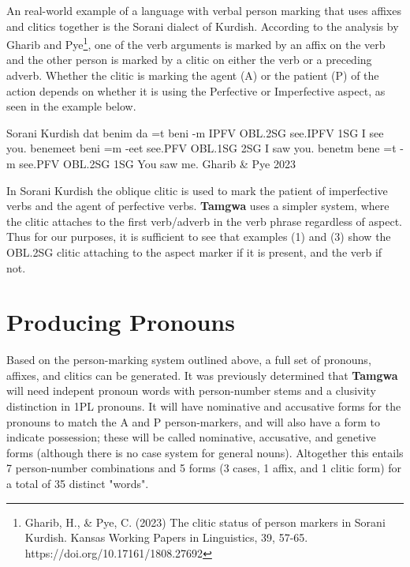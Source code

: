 \documentclass[a4paper,12pt,twoside,openright]{memoir}
\begin{document}
    An real-world example of a language with verbal person marking that uses affixes and clitics together is the Sorani dialect of Kurdish.  According to the analysis by Gharib and Pye\footnote{Gharib, H., \& Pye, C. (2023) The clitic status of person markers in Sorani Kurdish. Kansas Working Papers in Linguistics, 39, 57-65. https://doi.org/10.17161/1808.27692}, one of the verb arguments is marked by an affix on the verb and the other person is marked by a clitic on either the verb or a preceding adverb.  Whether the clitic is marking the agent (A) or the patient (P) of the action depends on whether it is using the Perfective or Imperfective aspect, as seen in the example below.

\begin{examples}
    \ex
    \lect Sorani Kurdish
    \words {} dat  benim
    \bits da =t beni -m
    \gloss IPFV OBL.2SG see.IPFV 1SG
    \tr I see you.
    \ex
    \words {} benemeet
    \bits beni =m -eet
    \gloss see.PFV OBL.1SG 2SG
    \tr I saw you.
    \ex
    \words {} benetm
    \bits bene =t -m
    \gloss see.PFV OBL.2SG 1SG
    \tr You saw me.
    \source Gharib \& Pye 2023
\end{examples}

    In Sorani Kurdish the oblique clitic is used to mark the patient of imperfective verbs and the agent of perfective verbs.  \textbf{Tamgwa} uses a simpler system, where the clitic attaches to the first verb/adverb in the verb phrase regardless of aspect.  Thus for our purposes, it is sufficient to see that examples (1) and (3) show the OBL.2SG clitic attaching to the aspect marker if it is present, and the verb if not.

\section*{Producing Pronouns}

    Based on the person-marking system outlined above, a full set of pronouns, affixes, and clitics can be generated.  It was previously determined that \textbf{Tamgwa} will need indepent pronoun words with person-number stems and a clusivity distinction in 1PL pronouns.  It will have nominative and accusative forms for the pronouns to match the A and P person-markers, and will also have a form to indicate possession; these will be called nominative, accusative, and genetive forms (although there is no case system for general nouns).  Altogether this entails 7 person-number combinations and 5 forms (3 cases, 1 affix, and 1 clitic form) for a total of 35 distinct "words".
\end{document}
